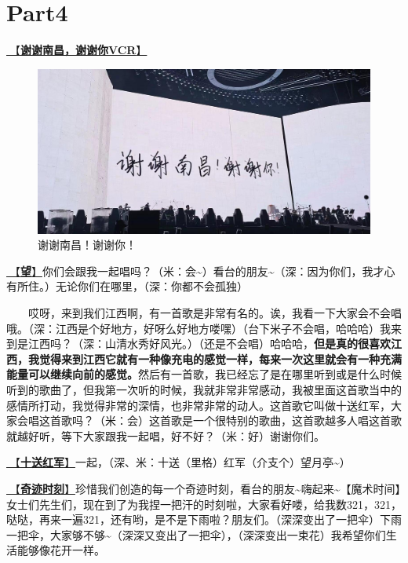 \documentclass[]{ctexbook}
\begin{document}
\section{Part4}\label{nanchang-20241123-part4}

\hyperref[thank-you-vcr]{🎥【\textbf{谢谢南昌，谢谢你VCR}】}

\begin{figure}

{\centering \includegraphics[width=400pt]{img/nanchang-20241123/thank-nanchang} 

}

\caption{谢谢南昌！谢谢你！}\label{fig:unnamed-chunk-145}
\end{figure}

\hyperref[Gaze]{🎵【\textbf{望}】}你们会跟我一起唱吗？（米：会\textasciitilde）看台的朋友\textasciitilde（深：因为你们，我才心有所住。）无论你们在哪里，（深：你都不会孤独）

  哎呀，来到我们江西啊，有一首歌是非常有名的。诶，我看一下大家会不会唱哦。（深：江西是个好地方，好呀么好地方喽嘿）（台下米子不会唱，哈哈哈）我来到是江西吗？（深：山清水秀好风光。）（还是不会唱）哈哈哈，\textbf{但是真的很喜欢江西，我觉得来到江西它就有一种像充电的感觉一样，每来一次这里就会有一种充满能量可以继续向前的感觉。}然后有一首歌，我已经忘了是在哪里听到或是什么时候听到的歌曲了，但我第一次听的时候，我就非常非常感动，我被里面这首歌当中的感情所打动，我觉得非常的深情，也非常非常的动人。这首歌它叫做十送红军，大家会唱这首歌吗？（米：会）这首歌是一个很特别的歌曲，这首歌越多人唱这首歌就越好听，等下大家跟我一起唱，好不好？（米：好）谢谢你们。

\hyperref[Seeing-off-the-Red-Amy]{🎵【\textbf{十送红军}】}一起，（深、米：十送（里格）红军（介支个）望月亭\textasciitilde）

\hyperref[magic-moment]{🎵【\textbf{奇迹时刻}】}珍惜我们创造的每一个奇迹时刻，看台的朋友\textasciitilde 嗨起来\textasciitilde【魔术时间】女士们先生们，现在到了为我捏一把汗的时刻啦，大家看好喽，给我数321，321，哒哒，再来一遍321，还有哟，是不是下雨啦？朋友们。（深深变出了一把伞）下雨一把伞，大家够不够\textasciitilde（深深又变出了一把伞），（深深变出一束花）我希望你们生活能够像花开一样。
\end{document}
